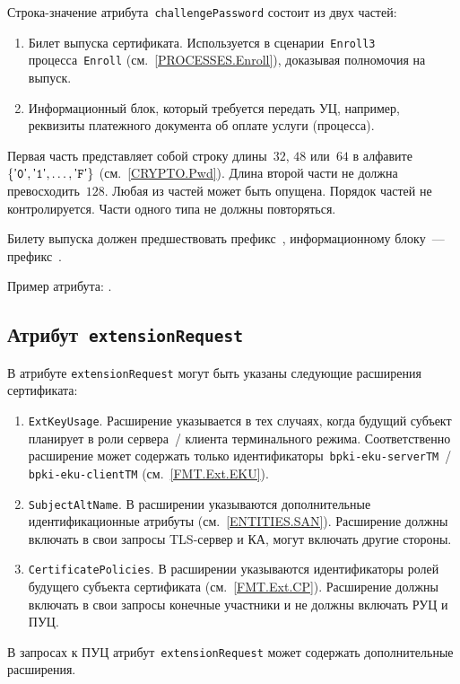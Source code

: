 Строка-значение атрибута~\texttt{challengePassword} состоит из двух частей:
\begin{enumerate} 
\item
Билет выпуска сертификата. Используется в сценарии~\texttt{Enroll3} 
процесса~\texttt{Enroll} (см.~\ref{PROCESSES.Enroll}), 
доказывая полномочия на выпуск.

\item
Информационный блок, который требуется передать УЦ,
например, реквизиты платежного документа об оплате услуги (процесса).
\end{enumerate}

Первая часть представляет собой строку длины~$32$, $48$ или~$64$ в алфавите 
$\{\texttt{\textsf{'}0\textsf{'}},\texttt{\textsf{'}1\textsf{'}},\ldots,\texttt{\textsf{'}F\textsf{'}}\}$ (см.~\ref{CRYPTO.Pwd}).
Длина второй части не должна превосходить~$128$. 
Любая из частей может быть опущена. 
Порядок частей не контролируется.
Части одного типа не должны повторяться.

Билету выпуска должен предшествовать префикс~,
информационному блоку~--- префикс~.

Пример атрибута: .

\subsection{Атрибут~\texttt{extensionRequest}}\label{FMT.CSR.ER}

В атрибуте \texttt{extensionRequest} могут быть указаны следующие 
расширения сертификата:
\begin{enumerate}
\item 
\texttt{ExtKeyUsage}. Расширение указывается в тех случаях, 
когда будущий субъект планирует в роли сервера~/ клиента терминального режима. 
Соответственно расширение может содержать только 
идентификаторы~\verb|bpki-eku-serverTM|~/ \verb|bpki-eku-clientTM| 
(см.~\ref{FMT.Ext.EKU}). 

\item 
\texttt{SubjectAltName}. В расширении указываются 
дополнительные идентификационные атрибуты (см.~\ref{ENTITIES.SAN}). 
Расширение должны включать в свои запросы TLS-сервер и КА,
могут включать другие стороны.

\item
\texttt{CertificatePolicies}. В расширении
указываются идентификаторы ролей будущего субъекта сертификата
(см.~\ref{FMT.Ext.CP}).
Расширение должны включать в свои запросы конечные участники 
и не должны включать РУЦ и ПУЦ.
\end{enumerate}

В запросах к ПУЦ атрибут~\texttt{extensionRequest} может содержать 
дополнительные расширения.
